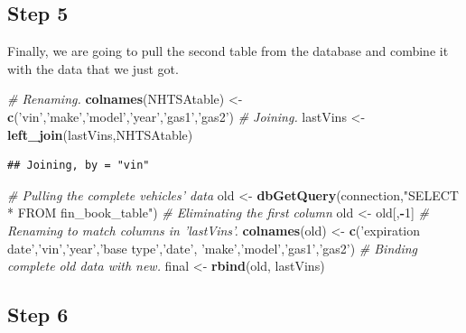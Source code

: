 \documentclass[]{book}
\newenvironment{Shaded}{\begin{snugshade}}{\end{snugshade}}
\newcommand{\CommentTok}[1]{\textcolor[rgb]{0.56,0.35,0.01}{\textit{#1}}}
\newcommand{\DecValTok}[1]{\textcolor[rgb]{0.00,0.00,0.81}{#1}}
\newcommand{\KeywordTok}[1]{\textcolor[rgb]{0.13,0.29,0.53}{\textbf{#1}}}
\newcommand{\NormalTok}[1]{#1}
\newcommand{\OperatorTok}[1]{\textcolor[rgb]{0.81,0.36,0.00}{\textbf{#1}}}
\newcommand{\StringTok}[1]{\textcolor[rgb]{0.31,0.60,0.02}{#1}}
\begin{document}
\hypertarget{step-5}{%
\subsection{Step 5}\label{step-5}}

Finally, we are going to pull the second table from the database and combine it with the data that we just got.

\begin{Shaded}
\begin{Highlighting}[]
\CommentTok{# Renaming.}
\KeywordTok{colnames}\NormalTok{(NHTSAtable) <-}\StringTok{ }\KeywordTok{c}\NormalTok{(}\StringTok{'vin'}\NormalTok{,}\StringTok{'make'}\NormalTok{,}\StringTok{'model'}\NormalTok{,}\StringTok{'year'}\NormalTok{,}\StringTok{'gas1'}\NormalTok{,}\StringTok{'gas2'}\NormalTok{)}
\CommentTok{# Joining.}
\NormalTok{lastVins <-}\StringTok{ }\KeywordTok{left_join}\NormalTok{(lastVins,NHTSAtable)}
\end{Highlighting}
\end{Shaded}

\begin{verbatim}
## Joining, by = "vin"
\end{verbatim}

\begin{Shaded}
\begin{Highlighting}[]
\CommentTok{# Pulling the complete vehicles' data}
\NormalTok{old <-}\StringTok{ }\KeywordTok{dbGetQuery}\NormalTok{(connection,}\StringTok{"SELECT * FROM fin_book_table"}\NormalTok{)}
\CommentTok{# Eliminating the first column}
\NormalTok{old <-}\StringTok{ }\NormalTok{old[,}\OperatorTok{-}\DecValTok{1}\NormalTok{]}
\CommentTok{# Renaming to match columns in 'lastVins'.}
\KeywordTok{colnames}\NormalTok{(old) <-}\StringTok{ }\KeywordTok{c}\NormalTok{(}\StringTok{'expiration date'}\NormalTok{,}\StringTok{'vin'}\NormalTok{,}\StringTok{'year'}\NormalTok{,}\StringTok{'base type'}\NormalTok{,}\StringTok{'date'}\NormalTok{,}
                   \StringTok{'make'}\NormalTok{,}\StringTok{'model'}\NormalTok{,}\StringTok{'gas1'}\NormalTok{,}\StringTok{'gas2'}\NormalTok{)}
\CommentTok{# Binding complete old data with new.}
\NormalTok{final <-}\StringTok{ }\KeywordTok{rbind}\NormalTok{(old, lastVins)}
\end{Highlighting}
\end{Shaded}

\hypertarget{step-6}{%
\subsection{Step 6}\label{step-6}}
\end{document}
